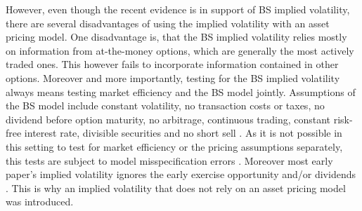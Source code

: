 However, even though the recent evidence is in support of \gls{BS} implied volatility, there are several disadvantages of using the implied volatility with an asset pricing model. One disadvantage is, that the \gls{BS} implied volatility relies mostly on information from at-the-money options, which are generally the most actively traded ones. This however fails to incorporate information contained in other options. Moreover and more importantly, testing for the \gls{BS} implied volatility always means testing market efficiency and the \gls{BS} model jointly. Assumptions of the \gls{BS} model include constant volatility, no transaction costs or taxes, no dividend before option maturity, no arbitrage, continuous trading, constant risk-free interest rate, divisible securities and no short sell \parencite{poon2003}. As it is not possible in this setting to test for market efficiency or the pricing assumptions separately, this tests are subject to model misspecification errors \parencite{jiang2003}. Moreover most early paper's implied volatility ignores the early exercise opportunity and/or dividends \parencite{blair2001}. This is why an implied volatility that does not rely on an asset pricing model was introduced. 


